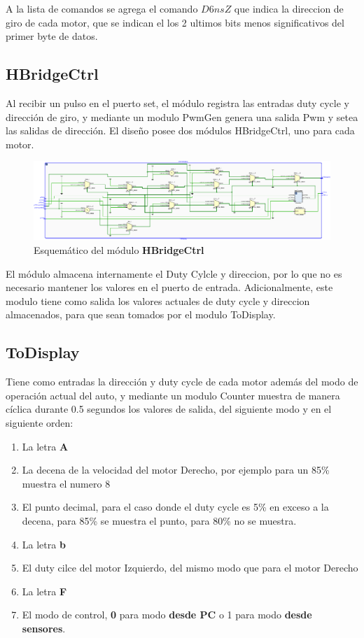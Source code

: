 \documentclass[12pt]{article}
\begin{document}
A la lista de comandos se agrega el comando $D6nsZ$ que indica la direccion de giro de cada motor, que se indican el los 2 ultimos bits menos significativos del primer byte de datos.

\subsection{HBridgeCtrl}
Al recibir un pulso en el puerto set, el módulo registra las entradas duty cycle y dirección de giro, y mediante un modulo PwmGen genera una salida Pwm  y setea las salidas de dirección. El diseño posee dos módulos HBridgeCtrl, uno para cada motor.

\begin{figure}[H]
    \centering
    \includegraphics[width=\textwidth]{to-display-crop}
    \caption{Esquemático del módulo \textbf{HBridgeCtrl}}
\end{figure}

El módulo almacena internamente el Duty Cylcle y direccion, por lo que no es necesario mantener los valores en el puerto de entrada.
Adicionalmente, este modulo tiene como salida los valores actuales de duty cycle y direccion almacenados, para que sean tomados por el modulo ToDisplay.

\subsection{ToDisplay}

Tiene como entradas la dirección y duty cycle de cada motor además del modo de operación actual del auto, y mediante un modulo Counter muestra de manera cíclica durante 0.5 segundos los valores de salida, del siguiente modo y en el siguiente orden:
\begin{enumerate}
\footnotesize
\item La letra \textbf{A}
\item La decena de la velocidad del motor Derecho, por ejemplo para un 85\% muestra el numero 8
\item El punto decimal, para el caso donde el duty cycle es 5\% en exceso a la decena, para 85\% se muestra el punto, para 80\% no se muestra.
\item La letra \textbf{b}
\item El duty cilce del motor Izquierdo, del mismo modo que para el motor Derecho
\item La letra \textbf{F}
\item El modo de control, \textbf{0} para modo \textbf{desde PC} o 1 para modo \textbf{desde sensores}.
\end{enumerate}
\end{document}
